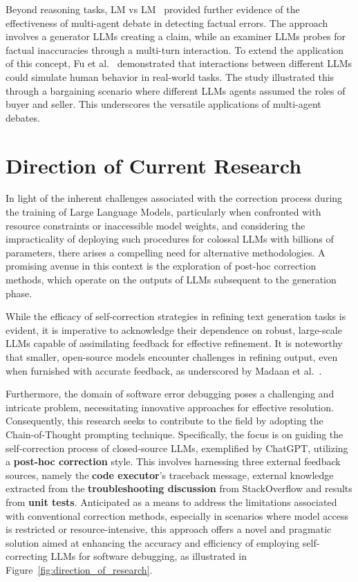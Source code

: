 \documentclass[a4paper,oneside]{book}
\begin{document}
Beyond reasoning tasks, LM vs LM~\cite{cohen2023lm} provided further evidence of the effectiveness of multi-agent debate in detecting factual errors. The approach involves a generator LLMs creating a claim, while an examiner LLMs probes for factual inaccuracies through a multi-turn interaction. To extend the application of this concept, Fu et al.~\cite{fu2023improving} demonstrated that interactions between different LLMs could simulate human behavior in real-world tasks. The study illustrated this through a bargaining scenario where different LLMs agents assumed the roles of buyer and seller. This underscores the versatile applications of multi-agent debates.

\section{Direction of Current Research}
In light of the inherent challenges associated with the correction process during the training of Large Language Models, particularly when confronted with resource constraints or inaccessible model weights, and considering the impracticality of deploying such procedures for colossal LLMs with billions of parameters, there arises a compelling need for alternative methodologies. A promising avenue in this context is the exploration of post-hoc correction methods, which operate on the outputs of LLMs subsequent to the generation phase.

While the efficacy of self-correction strategies in refining text generation tasks is evident, it is imperative to acknowledge their dependence on robust, large-scale LLMs capable of assimilating feedback for effective refinement. It is noteworthy that smaller, open-source models encounter challenges in refining output, even when furnished with accurate feedback, as underscored by Madaan et al.~\cite{madaan2023selfrefine}.

Furthermore, the domain of software error debugging poses a challenging and intricate problem, necessitating innovative approaches for effective resolution. Consequently, this research seeks to contribute to the field by adopting the Chain-of-Thought prompting technique. Specifically, the focus is on guiding the self-correction process of closed-source LLMs, exemplified by ChatGPT, utilizing a \textbf{post-hoc correction} style. This involves harnessing three external feedback sources, namely the \textbf{code executor}'s traceback message, external knowledge extracted from the \textbf{troubleshooting discussion} from StackOverflow and results from \textbf{unit tests}. Anticipated as a means to address the limitations associated with conventional correction methods, especially in scenarios where model access is restricted or resource-intensive, this approach offers a novel and pragmatic solution aimed at enhancing the accuracy and efficiency of employing self-correcting LLMs for software debugging, as illustrated in Figure~\ref{fig:direction_of_research}.
\end{document}
